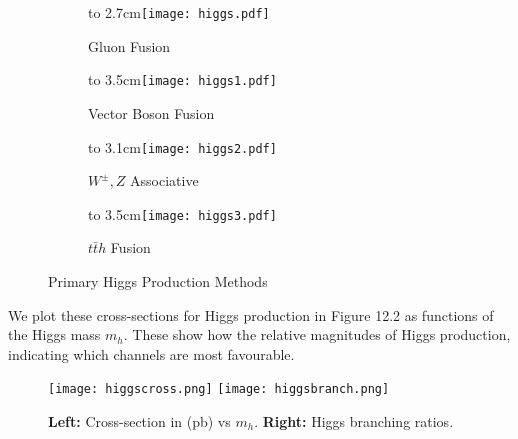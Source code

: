 \documentclass[a4paper, 11pt, normalem]{report}
\def\imagebox#1#2{\vtop to #1{\null\hbox{#2}\vfill}}
\begin{document}
\begin{figure}[H]
    \centering
    \begin{subfigure}[b]{0.24\textwidth}
        \imagebox{2.7cm}{\texttt{[image: higgs.pdf]}}
        \caption{Gluon Fusion}
    \end{subfigure}
    \begin{subfigure}[b]{0.24\textwidth}
        \imagebox{3.5cm}{\texttt{[image: higgs1.pdf]}}
        \caption{Vector Boson Fusion}
    \end{subfigure}
    \begin{subfigure}[b]{0.24\textwidth}
        \imagebox{3.1cm}{\texttt{[image: higgs2.pdf]}}
        \caption{$W^\pm,Z$ Associative}
    \end{subfigure}
    \begin{subfigure}[b]{0.24\textwidth}
        \imagebox{3.5cm}{\texttt{[image: higgs3.pdf]}}
        \caption{$t\bar{t}h$ Fusion}
    \end{subfigure}
    \caption{Primary Higgs Production Methods}
    \vspace{-10pt}
\end{figure}
We plot these cross-sections for Higgs production in Figure 12.2 as functions of the Higgs mass $m_h$.
These show how the relative magnitudes of Higgs production, indicating which channels are most favourable.
\begin{figure}[H]
    \centering
    \texttt{[image: higgscross.png]}
    \texttt{[image: higgsbranch.png]}
    \caption{\textbf{Left:} Cross-section in (pb) vs $m_h$. \textbf{Right:} Higgs branching ratios.}
\end{figure}
\end{document}
